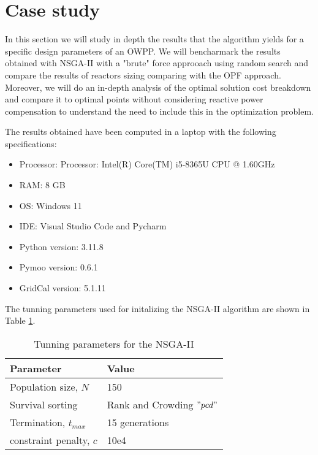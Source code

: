 \documentclass[a4paper,11pt, titlepage, twoside]{article}
\begin{document}
\section{Case study}\label{CaseStudies}

In this section we will study in depth the results that the algorithm yields for a specific design parameters
of an OWPP. We will bencharmark the results obtained with NSGA-II with a "brute" force approoach using random search and compare the results of reactors sizing comparing with the OPF
approach. Moreover, we will do an in-depth analysis of the optimal solution cost breakdown and compare it to optimal points without considering reactive power compensation to understand the need
to include this in the optimization problem.



The results obtained have been computed in a laptop with the following specifications:
\begin{itemize}
    \item Processor: Processor: Intel(R) Core(TM) i5-8365U CPU @ 1.60GHz
    \item RAM: 8 GB
    \item OS: Windows 11
    \item IDE: Visual Studio Code and Pycharm
    \item Python version: 3.11.8
    \item Pymoo version: 0.6.1
    \item GridCal version: 5.1.11
\end{itemize}

The tunning parameters used for initalizing the NSGA-II algorithm are shown in Table \ref{tab:NSGAII_parameters}.

\begin{table}[h]
\centering
    \begin{tabular}{l|l}
    \hline
    \textbf{Parameter} & \textbf{Value} \\ \hline
    Population size, $N$ & 150 \\ \hline
    Survival sorting & Rank and Crowding $"pcd"$ \\ \hline
    Termination, $t_{max}$  & 15 generations \\ \hline
    constraint penalty, $c$ & 10e4 \\ \hline
    \end{tabular}
    \caption{Tunning parameters for the NSGA-II}
    \label{tab:NSGAII_parameters}
\end{table}
\end{document}
